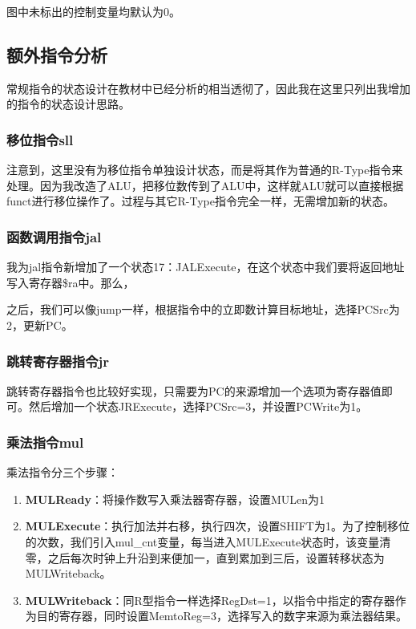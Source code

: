 \documentclass[12pt]{article} %
\begin{document}
\begin{sloppypar}
图中未标出的控制变量均默认为0。

\subsection{额外指令分析}

常规指令的状态设计在教材中已经分析的相当透彻了，因此我在这里只列出我增加的指令的状态设计思路。

\subsubsection{移位指令sll}

注意到，这里没有为移位指令单独设计状态，而是将其作为普通的R-Type指令来处理。因为我改造了ALU，把移位数传到了ALU中，这样就ALU就可以直接根据funct进行移位操作了。过程与其它R-Type指令完全一样，无需增加新的状态。

\subsubsection{函数调用指令jal}

我为jal指令新增加了一个状态17：JALExecute，在这个状态中我们要将返回地址写入寄存器\$ra中。那么，

之后，我们可以像jump一样，根据指令中的立即数计算目标地址，选择PCSrc为2，更新PC。

\subsubsection{跳转寄存器指令jr}

跳转寄存器指令也比较好实现，只需要为PC的来源增加一个选项为寄存器值即可。然后增加一个状态JRExecute，选择PCSrc=3，并设置PCWrite为1。

\subsubsection{乘法指令mul}

乘法指令分三个步骤：
\begin{enumerate}
\item {\bf MULReady}：将操作数写入乘法器寄存器，设置MULen为1
\item {\bf MULExecute}：执行加法并右移，执行四次，设置SHIFT为1。为了控制移位的次数，我们引入mul\_cnt变量，每当进入MULExecute状态时，该变量清零，之后每次时钟上升沿到来便加一，直到累加到三后，设置转移状态为MULWriteback。
\item {\bf MULWriteback}：同R型指令一样选择RegDst=1，以指令中指定的寄存器作为目的寄存器，同时设置MemtoReg=3，选择写入的数字来源为乘法器结果。
\end{enumerate}


\end{sloppypar}
\end{document}

